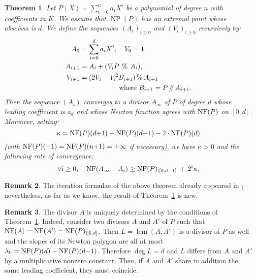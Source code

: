\documentclass{sig-alternate-05-2015}
\DeclareMathOperator{\NP}{NP}
\DeclareMathOperator{\lcm}{lcm}
\newcommand{\NF}{\text{\rm NF}}
\renewcommand{\mod}{\,\%\,}
\renewcommand{\div}{\,/\hspace{-0.3em}/\,}
\newtheorem{theo}{Theorem}[section]
\theoremstyle{definition}
\newtheorem{rem}[theo]{Remark}
\begin{document}
\begin{theo} \label{theo:slope-factor}
Let $P(X) = \sum_{i=0}^n a_i X^i$ be a polynomial of degree $n$ with
coefficients in $K$. We assume that $\NP(P)$ has an extremal point 
whose abscissa is $d$.
We define the sequences $(A_i)_{i \geq 0}$ and $(V_i)_{i \geq 0}$
recursively by:
\begin{align*}
A_0 & = \sum_{i=0}^d a_i X^i, \quad V_{0} = 1 \medskip \\
A_{i+1} &= A_i + (V_i P \:\mod\: A_i), \smallskip \\
V_{i+1} &= (2 V_i -V_i^2 B_{i+1} ) \mod A_{i+1} \\
& \hspace{2cm}\text{where } B_{i+1} = P \div A_{i+1}.
\end{align*}
Then the sequence $(A_i)$ converges to a divisor $A_\infty$ of $P$ 
of degree $d$ whose leading coefficient is $a_d$ and whose Newton 
function agrees with $\NF(P)$ on $[0,d]$.
Moreover, setting:
$$\kappa = \NF(P)(d{+}1) + \NF(P)(d{-}1) - 2 \cdot \NF(P)(d)$$
(with $\NF(P)(-1) = \NF(P)(n{+}1) = +\infty$ if necessary),
we have $\kappa > 0$ and the following rate of convergence:
\begin{equation}
\label{eq:rateconv}
\forall i \geq 0, \quad
\NF(A_\infty - A_i) \geq \NF(P)_{|[0,d{-}1]} \,+\, 2^i \kappa.
\end{equation}
\end{theo}

\begin{rem}
The iteration formulae of the above theorem already appeared 
in \cite[\S~3.1]{berthomieu:hal-00642075}; nevertheless, as far
as we know, the result of Theorem~\ref{theo:slope-factor} is
new.
\end{rem}

\begin{rem}
\label{rem:unicity}
The divisor $A$ is uniquely determined by the conditions of 
Theorem~\ref{theo:slope-factor}. Indeed, consider two divisors
$A$ and $A'$ of $P$ such that $\NF(A) = \NF(A') = \NF(P)_{|[0,d]}$.
Then $L = \lcm(A,A')$ is a divisor of $P$ as well and the 
slopes of its Newton polygon are all at most $\lambda_0 = \NF(P)(d) - 
\NF(P)(d{-}1)$. Therefore $\deg L = d$ and $L$ differs from $A$ and
$A'$ by a multiplicative nonzero constant. Then, if $A$ and $A'$ 
share in addition the same leading coefficient, they must coincide.
\end{rem}
\end{document}
